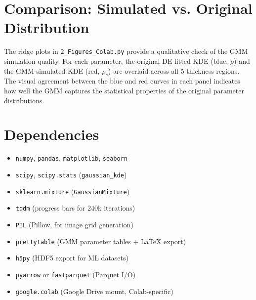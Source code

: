 \documentclass[11pt,a4paper]{article}
\begin{document}
\section{Comparison: Simulated vs. Original Distribution}

The ridge plots in {\tt 2\_Figures\_Colab.py} provide a qualitative check of the GMM simulation quality. For each parameter, the original DE-fitted KDE (blue, $\rho$) and the GMM-simulated KDE (red, $\rho_s$) are overlaid across all 5 thickness regions. The visual agreement between the blue and red curves in each panel indicates how well the GMM captures the statistical properties of the original parameter distributions.

\section{Dependencies}

\begin{itemize}
    \item {\tt numpy}, {\tt pandas}, {\tt matplotlib}, {\tt seaborn}
    \item {\tt scipy}, {\tt scipy.stats} ({\tt gaussian\_kde})
    \item {\tt sklearn.mixture} ({\tt GaussianMixture})
    \item {\tt tqdm} (progress bars for 240k iterations)
    \item {\tt PIL} (Pillow, for image grid generation)
    \item {\tt prettytable} (GMM parameter tables + LaTeX export)
    \item {\tt h5py} (HDF5 export for ML datasets)
    \item {\tt pyarrow} or {\tt fastparquet} (Parquet I/O)
    \item {\tt google.colab} (Google Drive mount, Colab-specific)
\end{itemize}
\end{document}

